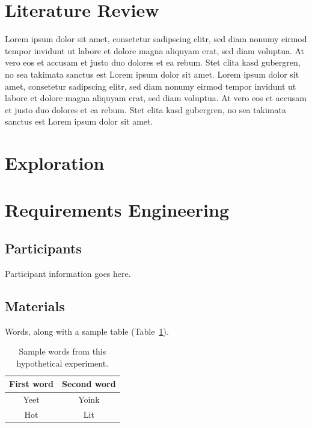 \documentclass[stu,12pt,floatsintext]{apa7}
\begin{document}
\section{Literature Review}

Lorem ipsum dolor sit amet, consetetur sadipscing elitr, sed diam nonumy eirmod tempor invidunt ut labore et dolore magna aliquyam erat, sed diam voluptua. At vero eos et accusam et justo duo dolores et ea rebum. Stet clita kasd gubergren, no sea takimata sanctus est Lorem ipsum dolor sit amet. Lorem ipsum dolor sit amet, consetetur sadipscing elitr, sed diam nonumy eirmod tempor invidunt ut labore et dolore magna aliquyam erat, sed diam voluptua. At vero eos et accusam et justo duo dolores et ea rebum. Stet clita kasd gubergren, no sea takimata sanctus est Lorem ipsum dolor sit amet.

\section{Exploration}

\section{Requirements Engineering }

\subsection{Participants}

Participant information goes here.

\subsection{Materials}

Words, along with a sample table (Table~\ref{tab:table_words}).

\begin{table}
    \caption{Sample words from this hypothetical experiment.}
    \centering
    \begin{tabular}{cc} %
        \hline 
         First word & Second word \\
         \hline
         Yeet & Yoink \\
         Hot & Lit \\
         \hline
    \end{tabular}
    \label{tab:table_words}
\end{table}
\end{document}
